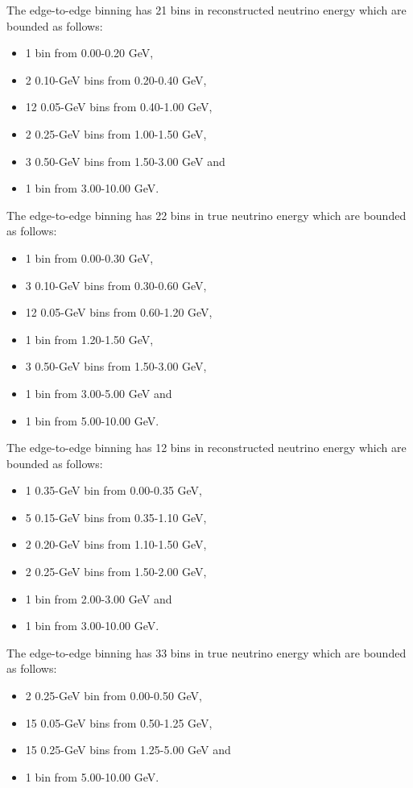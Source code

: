 The \numu edge-to-edge binning has 21 bins in reconstructed neutrino energy which are bounded as follows:
\begin{itemize}
    \item 1 bin from 0.00-0.20 GeV,
    \item 2 0.10-GeV bins from 0.20-0.40 GeV,
    \item 12 0.05-GeV bins from 0.40-1.00 GeV,
    \item 2 0.25-GeV bins from 1.00-1.50 GeV,
    \item 3 0.50-GeV bins from 1.50-3.00 GeV and
    \item 1 bin from 3.00-10.00 GeV.
\end{itemize}

The \numu edge-to-edge binning has 22 bins in true neutrino energy which are bounded as follows:
\begin{itemize}
    \item 1 bin from 0.00-0.30 GeV,
    \item 3 0.10-GeV bins from 0.30-0.60 GeV,
    \item 12 0.05-GeV bins from 0.60-1.20 GeV,
    \item 1 bin from 1.20-1.50 GeV,
    \item 3 0.50-GeV bins from 1.50-3.00 GeV,
    \item 1 bin from 3.00-5.00 GeV and
    \item 1 bin from 5.00-10.00 GeV.
\end{itemize}

The \nue edge-to-edge binning has 12 bins in reconstructed neutrino energy which are bounded as follows:
\begin{itemize}
    \item 1 0.35-GeV bin from 0.00-0.35 GeV,
    \item 5 0.15-GeV bins from 0.35-1.10 GeV,
    \item 2 0.20-GeV bins from 1.10-1.50 GeV,
    \item 2 0.25-GeV bins from 1.50-2.00 GeV,
    \item 1 bin from 2.00-3.00 GeV and
    \item 1 bin from 3.00-10.00 GeV.
\end{itemize}

The \nue edge-to-edge binning has 33 bins in true neutrino energy which are bounded as follows:
\begin{itemize}
    \item 2 0.25-GeV bin from 0.00-0.50 GeV,
    \item 15 0.05-GeV bins from 0.50-1.25 GeV,
    \item 15 0.25-GeV bins from 1.25-5.00 GeV and
    \item 1 bin from 5.00-10.00 GeV.
\end{itemize}

